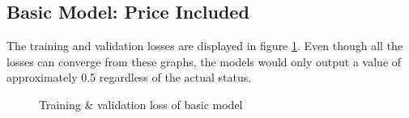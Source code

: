 \documentclass[12pt,twoside]{report}
\begin{document}
\subsection{Basic Model: Price Included}
The training and validation losses are displayed in figure \ref{basic_status}. Even though all the losses can converge from these graphs, the models would only output a value of approximately 0.5 regardless of the actual status.
\\

\begin{figure}[!htbp]
	\centering
	\hfill
	\hfill
	\hfil
	\hfil
	\caption{Training \& validation loss of basic model}
	\label{basic_status}
\end{figure}
\end{document}
